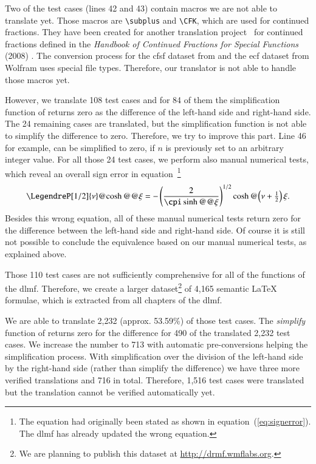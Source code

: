 Two of the test cases (lines 42 and 43) contain macros we are not able to translate yet. Those macros are \verb|\subplus| and \verb|\CFK|, which are used for continued fractions. They have been created for another translation project~\cite[§5]{CICM:Paper} for continued fractions defined in the \textit{Handbook of Continued Fractions for Special Functions} (2008) \cite{CF:Handbook}. The conversion process for the \gls{cfsf} \cite{CF:Maple} dataset from \Maple{} and the \gls{ecf} \cite{CF:eCF,eCF:FinalReport} dataset from Wolfram uses special file types. Therefore, our translator is not able to handle those macros yet.

However, we translate 108 test cases and for 84 of them the simplification function of \Maple{} returns zero as the difference of the left-hand side and right-hand side. The 24 remaining cases are translated, but the simplification function is not able to simplify the difference to zero. Therefore, we try to improve this part. Line 46~\cite[(18.5.10)]{NIST:DLMF} for example, can be simplified to zero, if $n$ is previously set to an arbitrary integer value. For all those 24 test cases, we perform also manual numerical tests, which reveal an overall sign error in equation~\cite[(14.5.14)]{NIST:DLMF}\footnote{The equation had originally been stated as shown in equation~(\ref{eq:signerror}). The \gls{dlmf} has already updated the wrong equation.}
\begin{equation}\label{eq:signerror}
\displaystyle \LegendreP[1/2]{\nu}@{\cosh@@{\xi}} = - \left( \frac{2}{\cpi \sinh@@{\xi}} \right)^{1/2} \cosh@{\left( \nu + \tfrac{1}{2} \right) \xi}.
\end{equation}
Besides this wrong equation, all of these manual numerical tests return zero for the difference between the left-hand side and right-hand side. Of course it is still not possible to conclude the equivalence based on our manual numerical tests, as explained above.

Those 110 test cases are not sufficiently comprehensive for all of the functions of the \gls{dlmf}. Therefore, we create a larger dataset\footnote{We are planning to publish this dataset at \url{http://drmf.wmflabs.org}.} of 4,165 semantic \LaTeX{} formulae, which is extracted from all chapters of the \gls{dlmf}. 

We are able to translate 2,232 (approx. 53.59\%) of those test cases. The \textit{simplify} function of \Maple{} returns zero for the difference for 490 of the translated 2,232 test cases. We increase the number to 713 with automatic pre-conversions helping the simplification process. With simplification over the division of the left-hand side by the right-hand side (rather than simplify the difference) we have three more verified translations and 716 in total. Therefore, 1,516 test cases were translated but the translation cannot be verified automatically yet.

